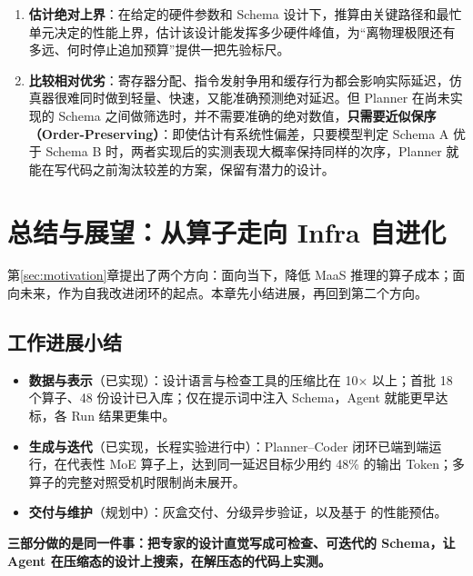 \begin{enumerate}[start=1]
\item
\textbf{估计绝对上界}：在给定的硬件参数和 Schema 设计下，推算由关键路径和最忙单元决定的性能上界，估计该设计能发挥多少硬件峰值，为“离物理极限还有多远、何时停止追加预算”提供一把先验标尺。


\item
\textbf{比较相对优劣}：寄存器分配、指令发射争用和缓存行为都会影响实际延迟，仿真器很难同时做到轻量、快速，又能准确预测绝对延迟。但 Planner 在尚未实现的 Schema 之间做筛选时，并不需要准确的绝对数值，\textbf{只需要近似保序（Order-Preserving）}：即使估计有系统性偏差，只要模型判定 Schema A 优于 Schema B 时，两者实现后的实测表现大概率保持同样的次序，Planner 就能在写代码之前淘汰较差的方案，保留有潜力的设计。


\end{enumerate}

\SourceSeparator
\clearpage
\section{总结与展望：从算子走向 Infra 自进化}\label{sec:outlook}
第\ref{sec:motivation}章提出了两个方向：面向当下，降低 MaaS 推理的算子成本；面向未来，作为自我改进闭环的起点。本章先小结进展，再回到第二个方向。


\subsection{工作进展小结}\label{sec:recap}
\begin{itemize}
\item
\textbf{数据与表示}（已实现）：设计语言与检查工具的压缩比在 10× 以上；首批 18 个算子、48 份设计已入库；仅在提示词中注入 Schema，Agent 就能更早达标，各 Run 结果更集中。


\item
\textbf{生成与迭代}（已实现，长程实验进行中）：Planner–Coder 闭环已端到端运行，在代表性 MoE 算子上，达到同一延迟目标少用约 48\% 的输出 Token；多算子的完整对照受机时限制尚未展开。


\item
\textbf{交付与维护}（规划中）：灰盒交付、分级异步验证，以及基于  的性能预估。


\end{itemize}

\textbf{三部分做的是同一件事：把专家的设计直觉写成可检查、可迭代的 Schema，让 Agent 在压缩态的设计上搜索，在解压态的代码上实测。}


